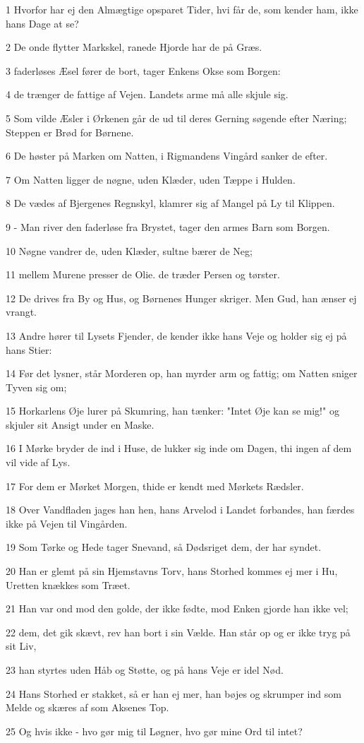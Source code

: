 \par 1 Hvorfor har ej den Almægtige opsparet Tider, hvi får de, som kender ham, ikke hans Dage at se?
\par 2 De onde flytter Markskel, ranede Hjorde har de på Græs.
\par 3 faderløses Æsel fører de bort, tager Enkens Okse som Borgen:
\par 4 de trænger de fattige af Vejen. Landets arme må alle skjule sig.
\par 5 Som vilde Æsler i Ørkenen går de ud til deres Gerning søgende efter Næring; Steppen er Brød for Børnene.
\par 6 De høster på Marken om Natten, i Rigmandens Vingård sanker de efter.
\par 7 Om Natten ligger de nøgne, uden Klæder, uden Tæppe i Hulden.
\par 8 De vædes af Bjergenes Regnskyl, klamrer sig af Mangel på Ly til Klippen.
\par 9 - Man river den faderløse fra Brystet, tager den armes Barn som Borgen.
\par 10 Nøgne vandrer de, uden Klæder, sultne bærer de Neg;
\par 11 mellem Murene presser de Olie. de træder Persen og tørster.
\par 12 De drives fra By og Hus, og Børnenes Hunger skriger. Men Gud, han ænser ej vrangt.
\par 13 Andre hører til Lysets Fjender, de kender ikke hans Veje og holder sig ej på hans Stier:
\par 14 Før det lysner, står Morderen op, han myrder arm og fattig; om Natten sniger Tyven sig om;
\par 15 Horkarlens Øje lurer på Skumring, han tænker: "Intet Øje kan se mig!" og skjuler sit Ansigt under en Maske.
\par 16 I Mørke bryder de ind i Huse, de lukker sig inde om Dagen, thi ingen af dem vil vide af Lys.
\par 17 For dem er Mørket Morgen, thide er kendt med Mørkets Rædsler.
\par 18 Over Vandfladen jages han hen, hans Arvelod i Landet forbandes, han færdes ikke på Vejen til Vingården.
\par 19 Som Tørke og Hede tager Snevand, så Dødsriget dem, der har syndet.
\par 20 Han er glemt på sin Hjemstavns Torv, hans Storhed kommes ej mer i Hu, Uretten knækkes som Træet.
\par 21 Han var ond mod den golde, der ikke fødte, mod Enken gjorde han ikke vel;
\par 22 dem, det gik skævt, rev han bort i sin Vælde. Han står op og er ikke tryg på sit Liv,
\par 23 han styrtes uden Håb og Støtte, og på hans Veje er idel Nød.
\par 24 Hans Storhed er stakket, så er han ej mer, han bøjes og skrumper ind som Melde og skæres af som Aksenes Top.
\par 25 Og hvis ikke - hvo gør mig til Løgner, hvo gør mine Ord til intet?

